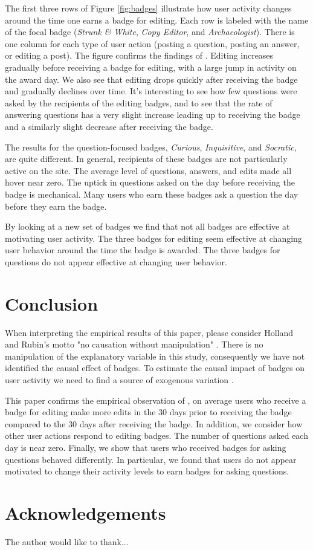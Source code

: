 \documentclass[conference]{IEEEtran}
\newcommand{\1}{\mathds{1}}
\begin{document}
The first three rows of Figure \ref{fig:badges} illustrate how user activity changes around the time one earns a badge for editing. Each row is labeled with the name of the focal badge (\textit{Strunk \& White}, \textit{Copy Editor}, and \textit{Archaeologist}). There is one column for each type of user action (posting a question, posting an answer, or editing a post). The figure confirms the findings of \citet{Grant2013}. Editing increases gradually before receiving a badge for editing, with a large jump in activity on the award day. We also see that editing drops quickly after receiving the badge and gradually declines over time. It's interesting to see how few questions were asked by the recipients of the editing badges, and to see that the rate of answering questions has a very slight increase leading up to receiving the badge and a similarly slight decrease after receiving the badge.

The results for the question-focused badges, \textit{Curious}, \textit{Inquisitive}, and \textit{Socratic}, are quite different. In general, recipients of these badges are not particularly active on the site. The average level of questions, answers, and edits made all hover near zero. The uptick in questions asked on the day before receiving the badge is mechanical. Many users who earn these badges ask a question the day before they earn the badge.

By looking at a new set of badges we find that not all badges are effective at motivating user activity. The three badges for editing seem effective at changing user behavior around the time the badge is awarded. The three badges for questions do not appear effective at changing user behavior.

\section{Conclusion}

When interpreting the empirical results of this paper, please consider Holland and Rubin's motto "no causation without manipulation" \citep{Holland1986}. There is no manipulation of the explanatory variable in this study, consequently we have not identified the causal effect of badges. To estimate the causal impact of badges on user activity we need to find a source of exogenous variation \citep{Miller2013}.

This paper confirms the empirical observation of \citet{Grant2013}, on average users who receive a badge for editing make more edits in the 30 days prior to receiving the badge compared to the 30 days after receiving the badge. In addition, we consider how other user actions respond to editing badges. The number of questions asked each day is near zero. Finally, we show that users who received badges for asking questions behaved differently. In particular, we found that users do not appear motivated to change their activity levels to earn badges for asking questions.

\section*{Acknowledgements}

The author would like to thank...

\nocite{Antin2011, MSRChallenge2015, se-dump}

\renewcommand{\bibfont}{\small}


\end{document}
